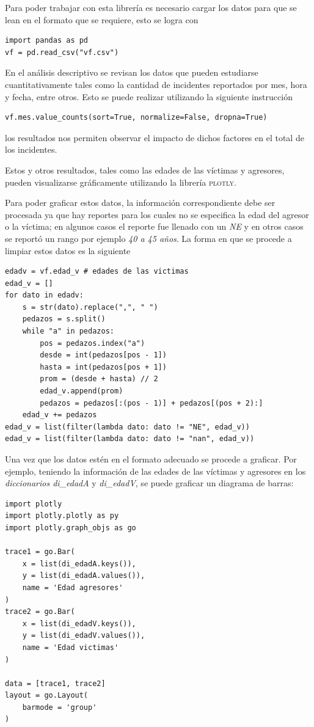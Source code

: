 \documentclass[final,5p,times]{elsarticle}
\begin{document}
Para poder trabajar con esta librer\'ia es necesario cargar los datos para que se lean en el formato que se requiere, esto se logra con
\begin{lstlisting}
import pandas as pd
vf = pd.read_csv("vf.csv")
\end{lstlisting}

En el an\'alisis descriptivo se revisan los datos que pueden estudiarse cuantitativamente tales como la cantidad de incidentes reportados por mes, hora y fecha, entre otros. Esto se puede realizar utilizando la siguiente instrucci\'on
\begin{lstlisting}
vf.mes.value_counts(sort=True, normalize=False, dropna=True)
\end{lstlisting}
los resultados nos permiten observar el impacto de dichos factores en el total de los incidentes. 

Estos y otros resultados, tales como las edades de las v\'ictimas y agresores, pueden visualizarse gr\'aficamente utilizando la librer\'ia \textsc{plotly}. 

Para poder graficar estos datos, la informaci\'on correspondiente debe ser procesada ya que hay reportes para los cuales no se especifica la edad del agresor o la v\'ictima; en algunos casos el reporte fue llenado con un \textit{NE} y en otros casos se report\'o un rango por ejemplo \textit{40 a 45 a\~nos}. La forma en que se procede a limpiar estos datos es la siguiente
\begin{lstlisting}
edadv = vf.edad_v # edades de las victimas
edad_v = []
for dato in edadv:
    s = str(dato).replace(",", " ")
    pedazos = s.split()   
    while "a" in pedazos:
        pos = pedazos.index("a")
        desde = int(pedazos[pos - 1])
        hasta = int(pedazos[pos + 1])
        prom = (desde + hasta) // 2
        edad_v.append(prom)
        pedazos = pedazos[:(pos - 1)] + pedazos[(pos + 2):]
    edad_v += pedazos
edad_v = list(filter(lambda dato: dato != "NE", edad_v)) 
edad_v = list(filter(lambda dato: dato != "nan", edad_v))
\end{lstlisting}

Una vez que los datos est\'en en el formato adecuado se procede a graficar. Por ejemplo, teniendo la informaci\'on de las edades de las v\'ictimas y agresores en los \textit{diccionarios di\_edadA} y \textit{di\_edadV}, se puede graficar un diagrama de barras:
\begin{lstlisting}
import plotly
import plotly.plotly as py
import plotly.graph_objs as go

trace1 = go.Bar(
    x = list(di_edadA.keys()),
    y = list(di_edadA.values()),
    name = 'Edad agresores'
)
trace2 = go.Bar(
    x = list(di_edadV.keys()),
    y = list(di_edadV.values()),
    name = 'Edad victimas'
)

data = [trace1, trace2]
layout = go.Layout(
    barmode = 'group'
)
\end{lstlisting}
\end{document}

